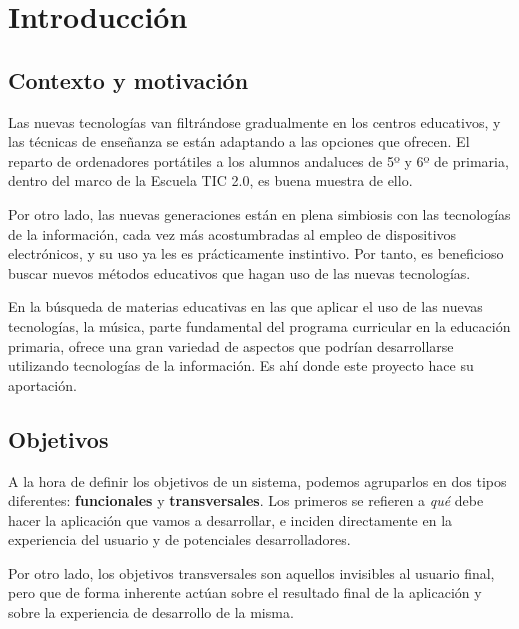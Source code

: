 \documentclass[a4paper, 12pt, halfparskip]{scrbook}
\begin{document}
\chapter{Introducción}
\section{Contexto y motivación}
Las nuevas tecnologías van filtrándose gradualmente en los centros
educativos, y las técnicas de enseñanza se están adaptando a las
opciones que ofrecen. El reparto de ordenadores portátiles a los
alumnos andaluces de 5º y 6º de primaria, dentro del marco de la
Escuela TIC 2.0, es buena muestra de ello. 

Por otro lado, las nuevas generaciones están en plena simbiosis con
las tecnologías de la información, cada vez más acostumbradas al
empleo de dispositivos electrónicos, y su uso ya les es prácticamente
instintivo. Por tanto, es beneficioso buscar nuevos métodos educativos
que hagan uso de las nuevas tecnologías.

En la búsqueda de materias educativas en las que aplicar el uso de las
nuevas tecnologías, la música, parte fundamental del programa
curricular en la educación primaria, ofrece una gran variedad de
aspectos que podrían desarrollarse utilizando tecnologías de la
información. Es ahí donde este proyecto hace su aportación.

\section{Objetivos}
A la hora de definir los objetivos de un sistema, podemos agruparlos
en dos tipos diferentes: \textbf{funcionales} y
\textbf{transversales}. Los primeros se refieren a \textit{qué} debe
hacer la aplicación que vamos a desarrollar, e inciden
directamente en la experiencia del usuario y de potenciales
desarrolladores.

Por otro lado, los objetivos transversales son aquellos invisibles al
usuario final, pero que de forma inherente actúan sobre el resultado
final de la aplicación y sobre la experiencia de desarrollo de la misma.
\end{document}

